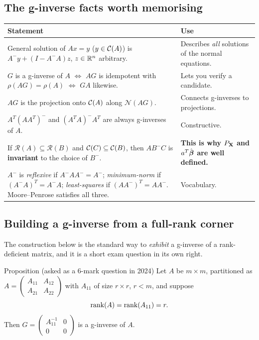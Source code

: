 \documentclass[11pt]{article}
\begin{document}
\subsection{The g-inverse facts worth memorising}

\begin{center}
\begin{tabular}{@{}p{7.6cm}p{7.0cm}@{}}
\toprule
Statement & Use \\
\midrule
General solution of $Ax=y$ ($y\in\mathcal{C}(A)$) is $A^-y+(I-A^-A)z$, $z\in\mathbb{R}^n$ arbitrary.
  & Describes \emph{all} solutions of the normal equations. \\
$G$ is a g-inverse of $A$ $\iff$ $AG$ is idempotent with $\rho(AG)=\rho(A)$ $\iff$ $GA$ likewise.
  & Lets you verify a candidate. \\
$AG$ is the projection onto $\mathcal{C}(A)$ along $\mathcal{N}(AG)$.
  & Connects g-inverses to projections. \\
$A^T(AA^T)^-$ and $(A^TA)^-A^T$ are always g-inverses of $A$. & Constructive. \\
If $\mathcal{R}(A)\subseteq\mathcal{R}(B)$ and $\mathcal{C}(C)\subseteq\mathcal{C}(B)$, then $AB^-C$ is
  \textbf{invariant} to the choice of $B^-$.
  & \textbf{This is why $P_{\mathbf{X}}$ and $a^T\hat{\boldsymbol{\beta}}$ are well defined.} \\
$A^-$ is \emph{reflexive} if $A^-AA^-=A^-$; \emph{minimum-norm} if $(A^-A)^T=A^-A$;
  \emph{least-squares} if $(AA^-)^T=AA^-$. Moore--Penrose satisfies all three.
  & Vocabulary. \\
\bottomrule
\end{tabular}
\end{center}

\subsection{Building a g-inverse from a full-rank corner}

The construction below is the standard way to \emph{exhibit} a g-inverse of a rank-deficient
matrix, and it is a short exam question in its own right.

\begin{idea}{Proposition (asked as a 6-mark question in 2024)}
Let $A$ be $m\times m$, partitioned as
$A=\begin{pmatrix}A_{11}&A_{12}\\A_{21}&A_{22}\end{pmatrix}$ with $A_{11}$ of size
$r\times r$, $r<m$, and suppose
\[
  \operatorname{rank}(A)=\operatorname{rank}(A_{11})=r .
\]
Then $G=\begin{pmatrix}A_{11}^{-1}&0\\0&0\end{pmatrix}$ is a g-inverse of $A$.
\end{idea}
\end{document}
